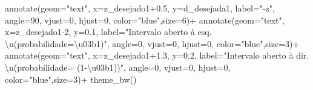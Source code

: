 \documentclass[
]{book}
\newenvironment{Shaded}{\begin{snugshade}}{\end{snugshade}}
\newcommand{\AttributeTok}[1]{\textcolor[rgb]{0.77,0.63,0.00}{#1}}
\newcommand{\DecValTok}[1]{\textcolor[rgb]{0.00,0.00,0.81}{#1}}
\newcommand{\FloatTok}[1]{\textcolor[rgb]{0.00,0.00,0.81}{#1}}
\newcommand{\FunctionTok}[1]{\textcolor[rgb]{0.00,0.00,0.00}{#1}}
\newcommand{\NormalTok}[1]{#1}
\newcommand{\SpecialCharTok}[1]{\textcolor[rgb]{0.00,0.00,0.00}{#1}}
\newcommand{\StringTok}[1]{\textcolor[rgb]{0.31,0.60,0.02}{#1}}
\begin{document}
\begin{Shaded}
\begin{Highlighting}[]
  \FunctionTok{annotate}\NormalTok{(}\AttributeTok{geom=}\StringTok{"text"}\NormalTok{, }\AttributeTok{x=}\NormalTok{z\_desejado1}\FloatTok{+0.5}\NormalTok{, }\AttributeTok{y=}\NormalTok{d\_desejada1, }\AttributeTok{label=}\StringTok{"{-}z"}\NormalTok{, }\AttributeTok{angle=}\DecValTok{90}\NormalTok{, }\AttributeTok{vjust=}\DecValTok{0}\NormalTok{, }\AttributeTok{hjust=}\DecValTok{0}\NormalTok{, }\AttributeTok{color=}\StringTok{"blue"}\NormalTok{,}\AttributeTok{size=}\DecValTok{6}\NormalTok{)}\SpecialCharTok{+}
  \FunctionTok{annotate}\NormalTok{(}\AttributeTok{geom=}\StringTok{"text"}\NormalTok{, }\AttributeTok{x=}\NormalTok{z\_desejado1}\DecValTok{{-}2}\NormalTok{, }\AttributeTok{y=}\FloatTok{0.1}\NormalTok{, }\AttributeTok{label=}\StringTok{"Intervalo aberto à esq. }\SpecialCharTok{\textbackslash{}n}\StringTok{(probabilidade=\textbackslash{}u03b1)"}\NormalTok{, }\AttributeTok{angle=}\DecValTok{0}\NormalTok{, }\AttributeTok{vjust=}\DecValTok{0}\NormalTok{, }\AttributeTok{hjust=}\DecValTok{0}\NormalTok{, }\AttributeTok{color=}\StringTok{"blue"}\NormalTok{,}\AttributeTok{size=}\DecValTok{3}\NormalTok{)}\SpecialCharTok{+}
  \FunctionTok{annotate}\NormalTok{(}\AttributeTok{geom=}\StringTok{"text"}\NormalTok{, }\AttributeTok{x=}\NormalTok{z\_desejado1}\FloatTok{+1.3}\NormalTok{, }\AttributeTok{y=}\FloatTok{0.2}\NormalTok{, }\AttributeTok{label=}\StringTok{"Intervalo aberto à dir. }\SpecialCharTok{\textbackslash{}n}\StringTok{(probabilidade= (1{-}\textbackslash{}u03b1))"}\NormalTok{, }\AttributeTok{angle=}\DecValTok{0}\NormalTok{, }\AttributeTok{vjust=}\DecValTok{0}\NormalTok{, }\AttributeTok{hjust=}\DecValTok{0}\NormalTok{, }\AttributeTok{color=}\StringTok{"blue"}\NormalTok{,}\AttributeTok{size=}\DecValTok{3}\NormalTok{)}\SpecialCharTok{+}
  \FunctionTok{theme\_bw}\NormalTok{()}
\end{Highlighting}
\end{Shaded}
\end{document}
